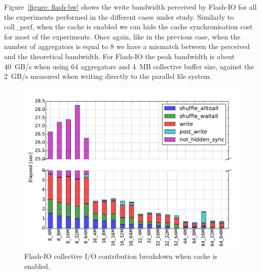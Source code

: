 Figure~\ref{figure: flash-bw} shows the write bandwidth perceived by Flash-IO for all the experiments performed in the different cases under study. Similarly to coll\_perf, when the cache is enabled we can hide the cache synchronisation cost for most of the experiments. Once again, like in the previous case, when the number of aggregators is equal to 8 we have a mismatch between the perceived and the theoretical bandwidth. For Flash-IO the peak bandwidth is about 40~GB/s when using 64 aggregators and 4~MB collective buffer size, against the 2~GB/s measured when writing directly to the parallel file system.
\begin{figure}[htb]
  \centering
  \includegraphics[width=0.95\columnwidth]{chapters/chapter3/figures/flash_32GB_30sec_elapsed_enable}
  \caption{Flash-IO collective I/O contribution breakdown when cache is enabled.}
  \label{figure: flash-elaps-enable}
\end{figure}

